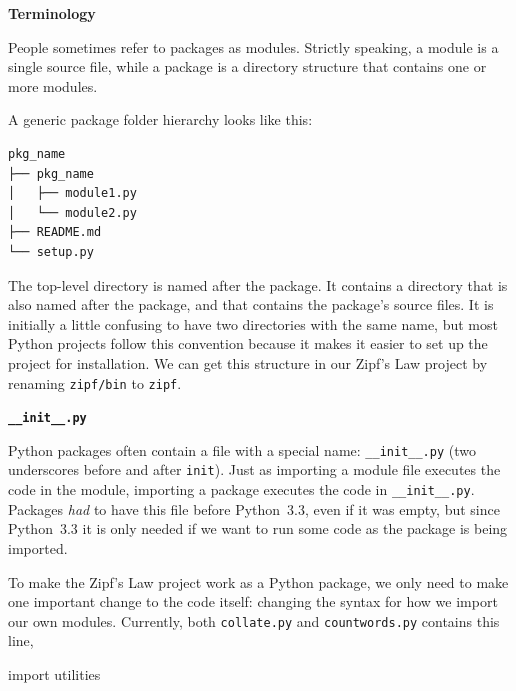 \documentclass[
]{krantz}
\makeatletter
\newenvironment{Shaded}{\begin{snugshade}}{\end{snugshade}}
\newcommand{\ImportTok}[1]{#1}
\newcommand{\NormalTok}[1]{#1}
\renewenvironment{quote}{\begin{VF}}{\end{VF}}
\newenvironment{kframe}{%
\medskip{}
\setlength{\fboxsep}{.8em}
 \def\at@end@of@kframe{}%
 \ifinner\ifhmode%
  \def\at@end@of@kframe{\end{minipage}}%
  \begin{minipage}{\columnwidth}%
 \fi\fi%
 \def\FrameCommand##1{\hskip\@totalleftmargin \hskip-\fboxsep
 \colorbox{shadecolor}{##1}\hskip-\fboxsep
     \hskip-\linewidth \hskip-\@totalleftmargin \hskip\columnwidth}%
 \MakeFramed {\advance\hsize-\width
   \@totalleftmargin\z@ \linewidth\hsize
   \@setminipage}}%
 {\par\unskip\endMakeFramed%
 \at@end@of@kframe}
\renewenvironment{Shaded}{\begin{kframe}}{\end{kframe}}
\makeatother
\begin{document}
\begin{quote}
\textbf{Terminology}

People sometimes refer to packages as modules.
Strictly speaking,
a module is a single source file,
while a package is a directory structure that contains one or more modules.
\end{quote}

A generic package folder hierarchy looks like this:

\begin{verbatim}
pkg_name
├── pkg_name
│   ├── module1.py
│   └── module2.py
├── README.md
└── setup.py
\end{verbatim}

The top-level directory is named after the package.
It contains a directory that is also named after the package,
and that contains the package's source files.
It is initially a little confusing to have two directories with the same name,
but most Python projects follow this convention because
it makes it easier to set up the project for installation.
We can get this structure in our Zipf's Law project
by renaming \texttt{zipf/bin} to \texttt{zipf}.

\begin{quote}
\textbf{\texttt{\_\_init\_\_.py}}

Python packages often contain a file with a special name:
\texttt{\_\_init\_\_.py}
(two underscores before and after \texttt{init}).
Just as importing a module file executes the code in the module,
importing a package executes the code in \texttt{\_\_init\_\_.py}.
Packages \emph{had} to have this file before Python~3.3,
even if it was empty,
but since Python~3.3 it is only needed
if we want to run some code as the package is being imported.
\end{quote}

To make the Zipf's Law project work as a Python package,
we only need to make one important change to the code itself:
changing the syntax for how we import our own modules.
Currently,
both \texttt{collate.py} and \texttt{countwords.py} contains this line,

\begin{Shaded}
\begin{Highlighting}[]
\ImportTok{import}\NormalTok{ utilities}
\end{Highlighting}
\end{Shaded}
\end{document}
